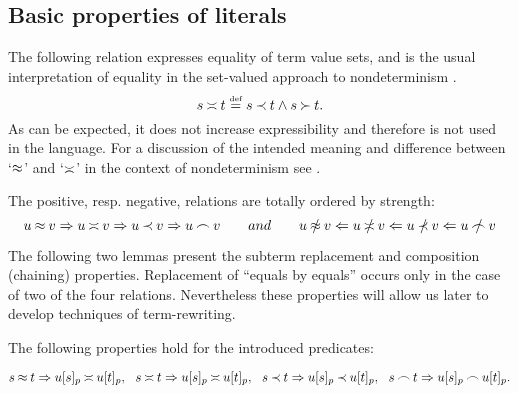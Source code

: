 \subsection{Basic properties of literals}

The following relation expresses equality of term value sets, and is the usual
 interpretation of equality
 in the set-valued approach to nondeterminism \cite{PS1,Kap}. 
\MyLPar \begin{equation}\MyLPar \label{eq:Seteq-definition}
s\Seteq t\Def s\Incl t\land s\Cont t.
\end{equation}
As can be expected, it does not increase 
expressibility and therefore is not used in the language.
For a discussion of the intended meaning and difference 
between `$\mathbin{\approx}$' and `$\mathbin{\asymp}$' in the context of nondeterminism 
see \cite{MW,Mich}. 

The positive, resp. negative, relations are totally ordered by strength:
\MyLPar\begin{equation}\MyLPar \label{eq:rel-order}
u\Eq v \impl u \Seteq v \impl u\Incl v \impl u\Int v
\hspace{2em} and \hspace{2em}
 u\notEq v \Leftarrow u \notSeteq v \Leftarrow
 u\notIncl v \Leftarrow u\notInt v 
\end{equation}

 The following two lemmas present the subterm replacement and
composition (chaining) properties. Replacement of
``equals by equals'' occurs only in the case of two of the four relations.
Nevertheless these properties will allow us later to develop techniques of
 term-rewriting. 

\begin{LEMMA}[Replacement] \label{le:replacement}
The following properties hold for the introduced predicates:

\(s\Eq t \impl   u[s]_p \Seteq  u[t]_p, \ \ 
s\Seteq t  \impl  u[s]_p \Seteq  u[t]_p, \ \ 
s\Incl t  \impl  u[s]_p \Incl  u[t]_p, \ \   
s\Int t  \impl  u[s]_p \Int  u[t]_p.\) 
\end{LEMMA}

